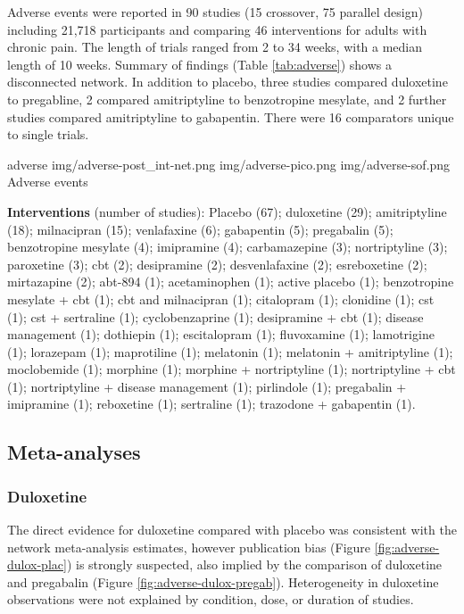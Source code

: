 \documentclass{report}\usepackage[]{graphicx}\usepackage[]{color}
\begin{document}
Adverse events were reported in 90 studies (15 crossover, 75 parallel design) including 21,718 participants and comparing 46 interventions for adults with chronic pain. The length of trials ranged from 2 to 34 weeks, with a median length of 10 weeks. Summary of findings (Table \ref{tab:adverse}) shows a disconnected network. In addition to placebo, three studies compared duloxetine to pregabline, 2 compared amitriptyline to benzotropine mesylate, and 2 further studies compared amitriptyline to gabapentin. There were 16 comparators unique to single trials.

\soffignew
{adverse}
{img/adverse-post_int-net.png}
{img/adverse-pico.png}
{img/adverse-sof.png}
{Adverse events}

\textbf{Interventions} (number of studies): Placebo (67); duloxetine (29); amitriptyline (18); milnacipran (15); venlafaxine (6); gabapentin (5); pregabalin (5); benzotropine mesylate (4); imipramine (4); carbamazepine (3); nortriptyline (3); paroxetine (3); cbt (2); desipramine (2); desvenlafaxine (2); esreboxetine (2); mirtazapine (2); abt-894 (1); acetaminophen (1); active placebo (1); benzotropine mesylate + cbt (1); cbt and milnacipran (1); citalopram (1); clonidine (1); cst (1); cst + sertraline (1); cyclobenzaprine (1); desipramine + cbt (1); disease management (1); dothiepin (1); escitalopram (1); fluvoxamine (1); lamotrigine (1); lorazepam (1); maprotiline (1); melatonin (1); melatonin + amitriptyline (1); moclobemide (1); morphine (1); morphine + nortriptyline (1); nortriptyline + cbt (1); nortriptyline + disease management (1); pirlindole (1); pregabalin + imipramine (1); reboxetine (1); sertraline (1); trazodone + gabapentin (1).




\subsection{Meta-analyses}

\subsubsection{Duloxetine}

The direct evidence for duloxetine compared with placebo was consistent with the network meta-analysis estimates, however publication bias (Figure \ref{fig:adverse-dulox-plac}) is strongly suspected, also implied by the comparison of duloxetine and pregabalin (Figure \ref{fig:adverse-dulox-pregab}). Heterogeneity in duloxetine observations were not explained by condition, dose, or duration of studies.
\end{document}
